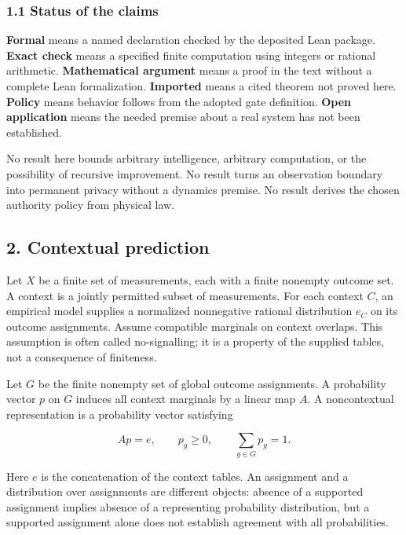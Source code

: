 \documentclass[
  10pt,
]{article}
\begin{document}
\subsubsection{1.1 Status of the claims}\label{status-of-the-claims}

\textbf{Formal} means a named declaration checked by the deposited Lean package. \textbf{Exact check} means a specified finite computation using integers or rational arithmetic. \textbf{Mathematical argument} means a proof in the text without a complete Lean formalization. \textbf{Imported} means a cited theorem not proved here. \textbf{Policy} means behavior follows from the adopted gate definition. \textbf{Open application} means the needed premise about a real system has not been established.

No result here bounds arbitrary intelligence, arbitrary computation, or the possibility of recursive improvement. No result turns an observation boundary into permanent privacy without a dynamics premise. No result derives the chosen authority policy from physical law.

\subsection{2. Contextual prediction}\label{contextual-prediction}

Let \protect\hypertarget{math-E0001-0001}{}{\(X\)} be a finite set of measurements, each with a finite nonempty outcome set. A context is a jointly permitted subset of measurements. For each context \protect\hypertarget{math-E0002-0002}{}{\(C\)}, an empirical model supplies a normalized nonnegative rational distribution \protect\hypertarget{math-E0003-0003}{}{\(e_C\)} on its outcome assignments. Assume compatible marginals on context overlaps. This assumption is often called no-signalling; it is a property of the supplied tables, not a consequence of finiteness.

Let \protect\hypertarget{math-E0004-0004}{}{\(G\)} be the finite nonempty set of global outcome assignments. A probability vector \protect\hypertarget{math-E0005-0005}{}{\(p\)} on \protect\hypertarget{math-E0004-0006}{}{\(G\)} induces all context marginals by a linear map \protect\hypertarget{math-E0006-0007}{}{\(A\)}. A noncontextual representation is a probability vector satisfying

\protect\hypertarget{math-E0007-0008}{}{\[
Ap=e,\qquad p_g\geq 0,\qquad \sum_{g\in G}p_g=1.
\]}

Here \protect\hypertarget{math-E0008-0009}{}{\(e\)} is the concatenation of the context tables. An assignment and a distribution over assignments are different objects: absence of a supported assignment implies absence of a representing probability distribution, but a supported assignment alone does not establish agreement with all probabilities.
\end{document}
